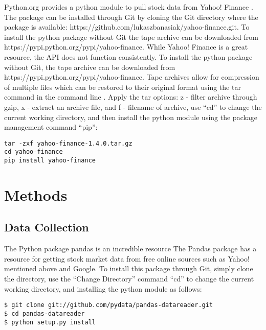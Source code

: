 \documentclass[sigconf]{acmart}
\begin{document}
Python.org provides a python module to pull stock data from Yahoo! Finance \cite{www-python-yahoo}. The package can be installed through Git by cloning the Git directory where the package is available: https://github.com/lukaszbanasiak/yahoo-finance.git. To install the python package without Git the tape archive can be downloaded from https://pypi.python.org/pypi/yahoo-finance. While Yahoo! Finance is a great resource, the API does not function consistently. To install the python package without Git, the tape archive can be downloaded from https://pypi.python.org/pypi/yahoo-finance. Tape archives allow for compression of multiple files which can be restored to their original format using the tar command in the command line \cite{www-tar}.  Apply the tar options: z - filter archive through gzip, x - extract an archive file, and f - filename of archive, use ``cd'' to change the current working directory, and then install the python module using the package management command ``pip'':
\begin{mdframed}[style=default]
\begin{lstlisting}
tar -zxf yahoo-finance-1.4.0.tar.gz
cd yahoo-finance
pip install yahoo-finance
\end{lstlisting}
\end{mdframed}


\section{Methods}
\subsection{Data Collection}


The Python package pandas is an incredible resource 
The Pandas package has a resource for getting stock market data from free online sources such as Yahoo! mentioned above and Google. To install this package through Git, simply clone the directory, use the ``Change Directory'' command ``cd'' to change the current working directory, and installing the python module as follows: 

\begin{mdframed}[style=default]
\begin{lstlisting}
$ git clone git://github.com/pydata/pandas-datareader.git
$ cd pandas-datareader
$ python setup.py install
\end{lstlisting}
\end{mdframed}
\end{document}
